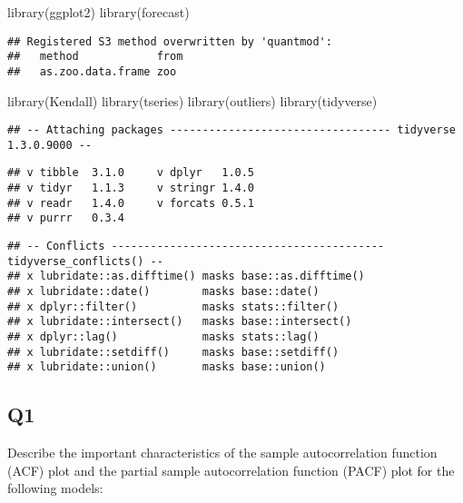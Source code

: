 \documentclass[
]{article}
\newenvironment{Shaded}{\begin{snugshade}}{\end{snugshade}}
\newcommand{\FunctionTok}[1]{\textcolor[rgb]{0.00,0.00,0.00}{#1}}
\newcommand{\NormalTok}[1]{#1}
\begin{document}
\begin{Shaded}
\begin{Highlighting}[]
\FunctionTok{library}\NormalTok{(ggplot2)}
\FunctionTok{library}\NormalTok{(forecast)  }
\end{Highlighting}
\end{Shaded}

\begin{verbatim}
## Registered S3 method overwritten by 'quantmod':
##   method            from
##   as.zoo.data.frame zoo
\end{verbatim}

\begin{Shaded}
\begin{Highlighting}[]
\FunctionTok{library}\NormalTok{(Kendall)}
\FunctionTok{library}\NormalTok{(tseries)}
\FunctionTok{library}\NormalTok{(outliers)}
\FunctionTok{library}\NormalTok{(tidyverse)}
\end{Highlighting}
\end{Shaded}

\begin{verbatim}
## -- Attaching packages ---------------------------------- tidyverse 1.3.0.9000 --
\end{verbatim}

\begin{verbatim}
## v tibble  3.1.0     v dplyr   1.0.5
## v tidyr   1.1.3     v stringr 1.4.0
## v readr   1.4.0     v forcats 0.5.1
## v purrr   0.3.4
\end{verbatim}

\begin{verbatim}
## -- Conflicts ------------------------------------------ tidyverse_conflicts() --
## x lubridate::as.difftime() masks base::as.difftime()
## x lubridate::date()        masks base::date()
## x dplyr::filter()          masks stats::filter()
## x lubridate::intersect()   masks base::intersect()
## x dplyr::lag()             masks stats::lag()
## x lubridate::setdiff()     masks base::setdiff()
## x lubridate::union()       masks base::union()
\end{verbatim}

\hypertarget{q1}{%
\subsection{Q1}\label{q1}}

Describe the important characteristics of the sample autocorrelation
function (ACF) plot and the partial sample autocorrelation function
(PACF) plot for the following models:
\end{document}
